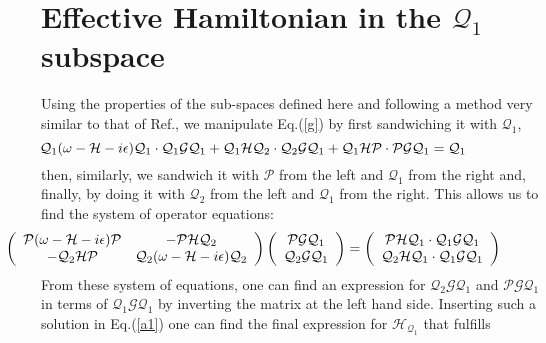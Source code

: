 \documentclass[12pt,a4paper,final]{iopart}
\begin{document}
\section{Effective Hamiltonian in the $\mathcal{Q}_1$ subspace}
\label{appendix}
Using the properties of the sub-spaces defined here and following a method very similar to that of Ref.\cite{yoshida1983}, we manipulate Eq.(\ref{g}) by first sandwiching it with $\mathcal{Q}_1$, 
\begin{equation}
\hspace*{-2cm}
\mathcal{Q}_1 (\omega-\mathcal{H}-i\epsilon)\mathcal{Q}_1\cdot\mathcal{Q}_1\mathcal{G}\mathcal{Q}_1 + \mathcal{Q}_1\mathcal{H}\mathcal{Q}_2\cdot\mathcal{Q}_2\mathcal{G}\mathcal{Q}_1+\mathcal{Q}_1\mathcal{H}\mathcal{P}\cdot\mathcal{P}\mathcal{G}\mathcal{Q}_1 = \mathcal{Q}_1 
\label{a1}
\end{equation}
then, similarly, we sandwich it with $\mathcal{P}$ from the left and $\mathcal{Q}_1$ from the right and, finally, by doing it with $\mathcal{Q}_2$ from the left and $\mathcal{Q}_1$ from the right. This allows us to find the system of operator equations: 
\[
\hspace*{-2cm}
   \left( {\begin{array}{cc}
            $$\mathcal{P}(\omega-\mathcal{H}-i\epsilon)\mathcal{P}$$ & $$-\mathcal{P}\mathcal{H}\mathcal{Q}_2$$ \\       
            $$-\mathcal{Q}_2\mathcal{H}\mathcal{P}$$ & $$\mathcal{Q}_2(\omega-\mathcal{H}-i\epsilon)\mathcal{Q}_2$$ \\      
           \end{array} } \right)
   \left( {\begin{array}{c}
            $$\mathcal{P}\mathcal{G}\mathcal{Q}_1$$ \\       
            $$\mathcal{Q}_2\mathcal{G}\mathcal{Q}_1$$ \\      
           \end{array} } \right) 
=
   \left( {\begin{array}{c}
            $$\mathcal{P}\mathcal{H}\mathcal{Q}_1\cdot\mathcal{Q}_1\mathcal{G}\mathcal{Q}_1$$ \\       
            $$\mathcal{Q}_2\mathcal{H}\mathcal{Q}_1\cdot\mathcal{Q}_1\mathcal{G}\mathcal{Q}_1$$ \\      
           \end{array} } \right)
\]
From these system of equations, one can find an expression for  $\mathcal{Q}_2\mathcal{G}\mathcal{Q}_1$ and $\mathcal{P}\mathcal{G}\mathcal{Q}_1$ in terms of $\mathcal{Q}_1\mathcal{G}\mathcal{Q}_1$ by inverting the matrix at the left hand side. Inserting such a solution in Eq.(\ref{a1}) one can find the final expression for $\mathcal{H}_{\mathcal{Q}_1}$ that fulfills
\end{document}
